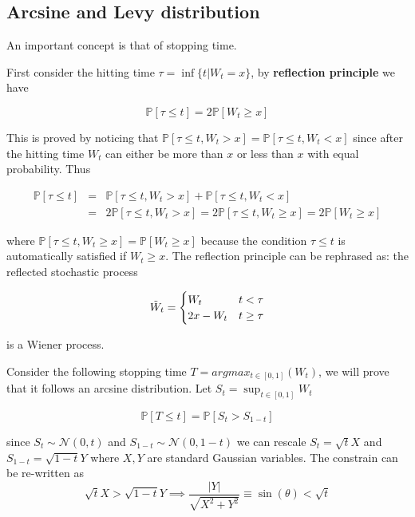 \documentclass[11pt,a4paper]{article}
\begin{document}
\subsection{Arcsine and Levy distribution}

An important concept is that of stopping time.

First consider the hitting time $\tau = \inf\{t| W_t = x\}$, by \textbf{reflection principle} we have

\begin{equation}
    \mathbb{P}[\tau\leq t] = 2 \mathbb{P}[W_t \geq x]
\end{equation}


This is proved by noticing that $\mathbb{P}[\tau\leq t, W_t>x] = \mathbb{P}[\tau\leq t, W_t<x]$ since after the hitting time $W_t$ can either be more than $x$ or less than $x$ with equal probability. Thus

\begin{eqnarray}
    \mathbb{P}[\tau\leq t] &=& \mathbb{P}[\tau\leq t,W_t>x]   + \mathbb{P}[\tau\leq t,W_t<x] \\
    &=& 2  \mathbb{P}[\tau\leq t,W_t>x] = 2\mathbb{P}[\tau\leq t,W_t\geq x] = 2\mathbb{P}[W_t \geq x]
\end{eqnarray}

where $\mathbb{P}[\tau\leq t,W_t\geq x] = \mathbb{P}[W_t \geq x]$ because the condition $\tau\leq t$ is automatically satisfied if $W_t\geq x$. 
The reflection principle can be rephrased as: the reflected stochastic process

\begin{equation}
    \Tilde{W}_t = 
    \begin{cases}
     W_t & t<\tau \\
     2x-W_t & t\geq \tau
    \end{cases}
\end{equation}

is a Wiener process.

Consider the following stopping time $T = argmax_{t \in [0,1]}(W_t)$, we will prove that it follows an arcsine distribution.  Let $S_t = \sup_{t \in [0,1]}W_t$

\begin{equation}
    \mathbb{P}[T \leq t] = \mathbb{P}[S_{t}>S_{1-t}]
\end{equation}

since $S_t \sim \mathcal{N}(0,t)$ and $S_{1-t} \sim \mathcal{N}(0,1-t)$ we can rescale $S_t = \sqrt{t}X$ and $S_{1-t} = \sqrt{1-t}Y$ where $X,Y$ are standard Gaussian variables. The constrain can be re-written as
\begin{equation}
    \sqrt{t}X>\sqrt{1-t}Y \implies \frac{|Y|}{\sqrt{X^2+Y^2}} \equiv \sin(\theta) <\sqrt{t}   
\end{equation} 
\end{document}
